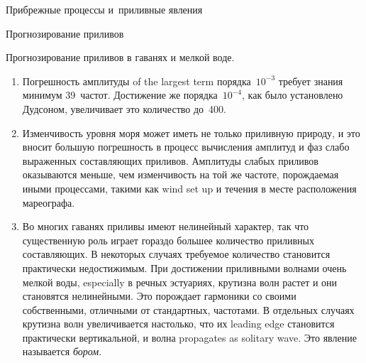 \begin{chapter}{Прибрежные процессы и~приливные явления}
\begin{section}{Прогнозирование приливов}
\begin{paragraph}{Прогнозирование приливов в гаванях и мелкой воде.}
\begin{enumerate}
\item 
Погрешность амплитуды of the largest term 
порядка~$10^{-3}$ требует знания минимум 39~частот. 
Достижение же порядка~$10^{-4}$, как было установлено Дудсоном, увеличивает
это количество до~400.
%

\item 
Изменчивость уровня моря может иметь не только приливную природу, и это
вносит большую погрешность в процесс вычисления амплитуд и фаз слабо 
выраженных составляющих приливов. Амплитуды слабых приливов оказываются
меньше, чем изменчивость на той же частоте, порождаемая иными процессами,
такими как wind set up и течения в месте расположения мареографа.
%

\item 
Во многих гаванях приливы имеют нелинейный характер, так что существенную
роль играет гораздо большее количество приливных составляющих. В некоторых
случаях требуемое количество становится практически недостижимым. 
При достижении приливными волнами очень мелкой воды, especially в речных
эстуариях, крутизна волн растет и они становятся нелинейными.
Это порождает гармоники со своими собственными, отличными от стандартных,
частотами. В отдельных случаях крутизна волн увеличивается настолько, 
что их leading edge становится практически вертикальной, и волна 
propagates as solitary wave. 
Это явление называется \emph{бором}.
%
\end{enumerate}


\end{paragraph}
\end{section}
\end{chapter}

